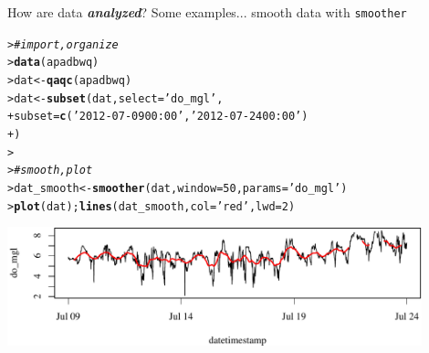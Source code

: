 \documentclass[serif]{beamer}\usepackage[]{graphicx}\usepackage[]{color}
\makeatletter
\newcommand{\hlnum}[1]{\textcolor[rgb]{0.686,0.059,0.569}{#1}}%
\newcommand{\hlstr}[1]{\textcolor[rgb]{0.192,0.494,0.8}{#1}}%
\newcommand{\hlcom}[1]{\textcolor[rgb]{0.678,0.584,0.686}{\textit{#1}}}%
\newcommand{\hlstd}[1]{\textcolor[rgb]{0.345,0.345,0.345}{#1}}%
\newcommand{\hlkwb}[1]{\textcolor[rgb]{0.69,0.353,0.396}{#1}}%
\newcommand{\hlkwc}[1]{\textcolor[rgb]{0.333,0.667,0.333}{#1}}%
\newcommand{\hlkwd}[1]{\textcolor[rgb]{0.737,0.353,0.396}{\textbf{#1}}}%
\newenvironment{kframe}{%
 \def\at@end@of@kframe{}%
 \ifinner\ifhmode%
  \def\at@end@of@kframe{\end{minipage}}%
  \begin{minipage}{\columnwidth}%
 \fi\fi%
 \def\FrameCommand##1{\hskip\@totalleftmargin \hskip-\fboxsep
 \colorbox{shadecolor}{##1}\hskip-\fboxsep
     \hskip-\linewidth \hskip-\@totalleftmargin \hskip\columnwidth}%
 \MakeFramed {\advance\hsize-\width
   \@totalleftmargin\z@ \linewidth\hsize
   \@setminipage}}%
 {\par\unskip\endMakeFramed%
 \at@end@of@kframe}
\newenvironment{knitrout}{}{} %
\newcommand{\Bigtxt}[1]{\textbf{\textit{#1}}}
\makeatother
\begin{document}
\begin{frame}[fragile,t]{How are data \Bigtxt{analyzed}?}
Some examples... smooth data with \texttt{smoother}
\begin{knitrout}\scriptsize
{}\color{fgcolor}\begin{kframe}
\begin{alltt}
\hlstd{> }\hlcom{# import, organize}
\hlstd{> }\hlkwd{data}\hlstd{(apadbwq)}
\hlstd{> }\hlstd{dat} \hlkwb{<-} \hlkwd{qaqc}\hlstd{(apadbwq)}
\hlstd{> }\hlstd{dat} \hlkwb{<-} \hlkwd{subset}\hlstd{(dat,} \hlkwc{select} \hlstd{=} \hlstr{'do_mgl'}\hlstd{,}
\hlstd{+ }  \hlkwc{subset} \hlstd{=} \hlkwd{c}\hlstd{(}\hlstr{'2012-07-09 00:00'}\hlstd{,} \hlstr{'2012-07-24 00:00'}\hlstd{)}
\hlstd{+ }  \hlstd{)}
\hlstd{> }
\hlstd{> }\hlcom{# smooth, plot}
\hlstd{> }\hlstd{dat_smooth} \hlkwb{<-} \hlkwd{smoother}\hlstd{(dat,} \hlkwc{window} \hlstd{=} \hlnum{50}\hlstd{,} \hlkwc{params} \hlstd{=} \hlstr{'do_mgl'}\hlstd{)}
\hlstd{> }\hlkwd{plot}\hlstd{(dat);} \hlkwd{lines}\hlstd{(dat_smooth,} \hlkwc{col} \hlstd{=} \hlstr{'red'}\hlstd{,} \hlkwc{lwd} \hlstd{=} \hlnum{2}\hlstd{)}
\end{alltt}
\end{kframe}

{\centering \includegraphics[width=0.9\textwidth]{fig//smooth-1} 

}



\end{knitrout}
\end{frame}
\end{document}
